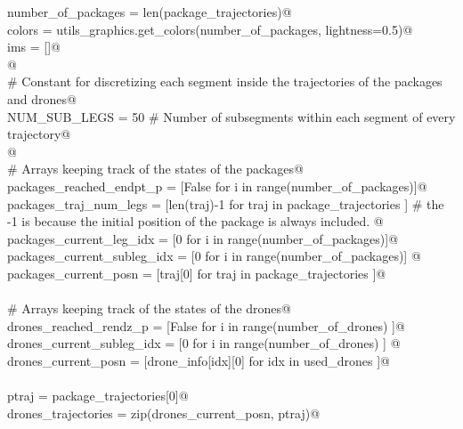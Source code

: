 \documentclass[10.0pt]{report}
\begin{document}
\begin{appendices}
\begin{flushleft}
\begin{list}{}{}
\mbox{}\verb@    number_of_packages = len(package_trajectories)@\\
\mbox{}\verb@    colors             = utils_graphics.get_colors(number_of_packages, lightness=0.5)@\\
\mbox{}\verb@    ims                = []@\\
\mbox{}\verb@    @\\
\mbox{}\verb@    # Constant for discretizing each segment inside the trajectories of the packages and drones@\\
\mbox{}\verb@    NUM_SUB_LEGS              = 50 # Number of subsegments within each segment of every trajectory@\\
\mbox{}\verb@    @\\
\mbox{}\verb@    # Arrays keeping track of the states of the packages@\\
\mbox{}\verb@    packages_reached_endpt_p    = [False        for  i    in range(number_of_packages)]@\\
\mbox{}\verb@    packages_traj_num_legs      = [len(traj)-1  for  traj in package_trajectories     ] # the -1 is because the initial position of the package is always included. @\\
\mbox{}\verb@    packages_current_leg_idx    = [0            for  i    in range(number_of_packages)]@\\
\mbox{}\verb@    packages_current_subleg_idx = [0            for  i    in range(number_of_packages)] @\\
\mbox{}\verb@    packages_current_posn       = [traj[0]      for traj in package_trajectories    ]@\\
\mbox{}\verb@@\\
\mbox{}\verb@    # Arrays keeping track of the states of the drones@\\
\mbox{}\verb@    drones_reached_rendz_p    = [False                for  i    in range(number_of_drones) ]@\\
\mbox{}\verb@    drones_current_subleg_idx = [0                    for i     in range(number_of_drones) ] @\\
\mbox{}\verb@    drones_current_posn       = [drone_info[idx][0]   for idx   in used_drones             ]@\\
\mbox{}\verb@@\\
\mbox{}\verb@    ptraj               = package_trajectories[0]@\\
\mbox{}\verb@    drones_trajectories = zip(drones_current_posn, ptraj)@\\
\mbox{}\verb@@\\

\end{list}
\end{flushleft}
\end{appendices}
\end{document}
